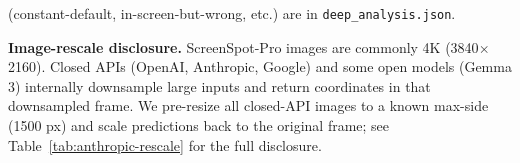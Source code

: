\begin{table}[t]
\begin{threeparttable}
\begin{tablenotes}
(constant-default, in-screen-but-wrong, etc.) are in
\texttt{deep\_analysis.json}.
\item \textbf{Image-rescale disclosure.}
ScreenSpot-Pro images are commonly 4K (3840$\times$2160). Closed APIs
(OpenAI, Anthropic, Google) and some open models (Gemma 3) internally
downsample large inputs and return coordinates in that downsampled
frame. We pre-resize all closed-API images to a known max-side
(1500 px) and scale predictions back to the original frame; see
Table~\ref{tab:anthropic-rescale} for the full disclosure.
\end{tablenotes}
\end{threeparttable}
\end{table}


